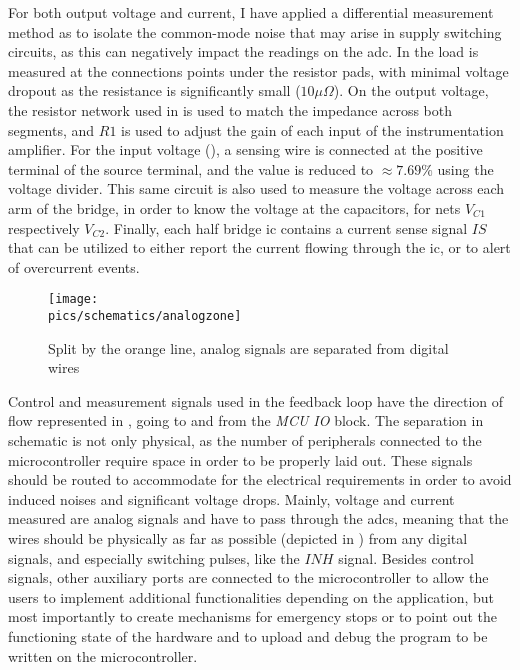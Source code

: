 For both output voltage and current, I have applied a differential measurement method as to isolate the common-mode noise that may arise in supply switching circuits, as this can negatively impact the readings on the \gls{adc}.
In  the load is measured at the connections points under the resistor pads, with minimal voltage dropout as the resistance is significantly small ($10\mu \Omega$).
On the output voltage, the resistor network used in  is used to match the impedance across both segments, and $R1$ is used to adjust the gain of each input of the instrumentation amplifier.
For the input voltage (), a sensing wire is connected at the positive terminal of the source terminal, and the value is reduced to $\approx 7.69\%$ using the voltage divider.
This same circuit is also used to measure the voltage across each arm of the bridge, in order to know the voltage at the capacitors, for nets $V_{C1}$ respectively $V_{C2}$.
Finally, each half bridge \gls{ic} contains a current sense signal $IS$ that can be utilized to either report the current flowing through the \gls{ic}, or to alert of overcurrent events.

\begin{figure}[!ht]
    \begin{center}\texttt{[image: \\pics/schematics/analogzone]}\end{center}
    \caption{Split by the orange line, analog signals are separated from digital wires}
    \label{fig:analogzone}
\end{figure}

Control and measurement signals used in the feedback loop have the direction of flow represented in , going to and from the \textit{MCU IO} block.
The separation in schematic is not only physical, as the number of peripherals connected to the microcontroller require space in order to be properly laid out.
These signals should be routed to accommodate for the electrical requirements in order to avoid induced noises and significant voltage drops.
Mainly, voltage and current measured are analog signals and have to pass through the \gls{adc}s, meaning that the wires should be physically as far as possible (depicted in ) from any digital signals, and especially switching pulses, like the $INH$ signal\cite{zumbahlen2007basic}.
Besides control signals, other auxiliary ports are connected to the microcontroller to allow the users to implement additional functionalities depending on the application, but most importantly to create mechanisms for emergency stops or to point out the functioning state of the hardware and to upload and debug the program to be written on the microcontroller.

